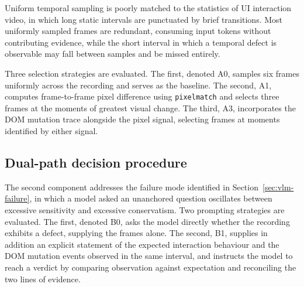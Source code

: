 Uniform temporal sampling is poorly matched to the statistics of UI
interaction video, in which long static intervals are punctuated by brief
transitions. Most uniformly sampled frames are redundant, consuming input
tokens without contributing evidence, while the short interval in which a
temporal defect is observable may fall between samples and be missed
entirely.

Three selection strategies are evaluated. The first, denoted A0, samples
six frames uniformly across the recording and serves as the baseline. The
second, A1, computes frame-to-frame pixel difference using
\texttt{pixelmatch} and selects three frames at the moments of greatest
visual change. The third, A3, incorporates the DOM mutation trace
alongside the pixel signal, selecting frames at moments identified by
either signal.

\subsection{Dual-path decision procedure}
\label{sec:dualpath}

The second component addresses the failure mode identified in
Section~\ref{sec:vlm-failure}, in which a model asked an unanchored
question oscillates between excessive sensitivity and excessive
conservatism. Two prompting strategies are evaluated. The first, denoted
B0, asks the model directly whether the recording exhibits a defect,
supplying the frames alone. The second, B1, supplies in addition an
explicit statement of the expected interaction behaviour and the DOM
mutation events observed in the same interval, and instructs the model to
reach a verdict by comparing observation against expectation and
reconciling the two lines of evidence.

